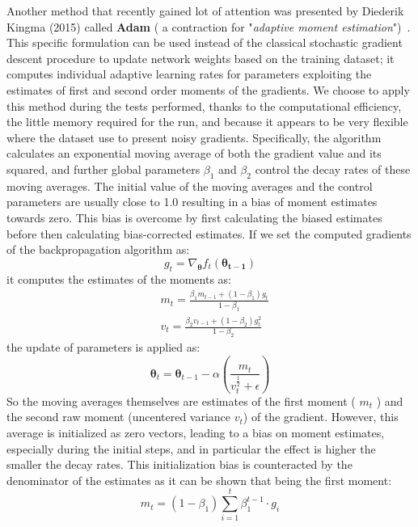 Another method that recently gained lot of attention was presented by Diederik Kingma (2015) called \textbf{Adam} ( a contraction for "\textit{adaptive moment estimation}")~\cite{kingma2014adam}. This specific formulation can be used instead of the classical stochastic gradient descent procedure to update network weights based on the training dataset; it computes individual adaptive learning rates for parameters exploiting the estimates of first and second order moments of the gradients. 
We choose to apply this method during the tests performed, thanks to the computational efficiency, the little memory required for the run, and because it appears to be very flexible where the dataset use to present noisy gradients.
Specifically, the algorithm calculates an exponential moving average of both the gradient value and its squared, and further global parameters $\beta_1$ and $\beta_2$ control the decay rates of these moving averages. 
The initial value of the moving averages and the control parameters are usually close to 1.0 resulting in a bias of moment estimates towards zero. This bias is overcome by first calculating the biased estimates before then calculating bias-corrected estimates.
If we set the computed gradients of the backpropagation algorithm as:
\begin{equation}
    g_t = \nabla_{\bm{\theta}} f_t(\bm{\theta_{t-1}})
\end{equation}
it computes the estimates of the moments as:
\begin{align}
    & m_t = \frac{\beta_1 m_{t-1} + (1 - \beta_1) g_t  }{1-\beta_1} \\
    & v_t = \frac{\beta_2 v_{t-1} + (1 - \beta_2) g_t^2}{1-\beta_2}
\end{align}
the update of parameters is applied as:
\begin{equation}
    \bm{\theta}_t = \bm{\theta}_{t-1} - \alpha \left( \frac{m_t}{v_t^\frac{1}{2} + \epsilon} \right)
\end{equation}
So the moving averages themselves are estimates of the first moment ( $m_t$ ) and the second raw moment (uncentered variance $v_t$) of the gradient.  However, this average is initialized as zero vectors, leading to a bias on moment estimates, especially during the initial steps, and in particular the effect is higher the smaller the decay rates. This initialization bias is counteracted by the denominator of the estimates as it can be shown that being the first moment:
\begin{equation}
    m_t = (1 - \beta_1) \sum_{i=1}^t \beta_1^{t-1} \cdot g_i
\end{equation}
